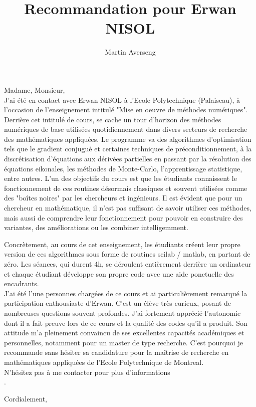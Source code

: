 \documentclass{letter}
\title{Recommandation pour Erwan NISOL}
\author{Martin Averseng}
\begin{document}
Madame, Monsieur, \\


J'ai été en contact avec Erwan NISOL à l'Ecole Polytechnique (Palaiseau), à l'occasion de l'enseignement intitulé "Mise en oeuvre de méthodes numériques". Derrière cet intitulé de cours, se cache un tour d'horizon des méthodes numériques de base utilisées quotidiennement dans divers secteurs de recherche des mathé\-matiques appliquées. Le programme va des algorithmes d'optimisation tels que le gradient conjugué et certaines techniques de préconditionnement, à la discrétisation d'équations aux dérivées partielles en passant par la résolution des équations eikonales, les méthodes de Monte-Carlo, l'apprentissage statistique, entre autres. L'un des objectifs du cours est que les étudiants connaissent le fonctionnement de ces routines désormais classiques et souvent utilisées comme des "boîtes noires" par les chercheurs et ingénieurs. Il est évident que pour un chercheur en mathématique, il n'est pas suffisant de savoir utiliser ces méthodes, mais aussi de comprendre leur fonctionnement pour pouvoir en construire des variantes, des améliorations ou les combiner intelligemment. 

Concrètement, au cours de cet enseignement, les étudiants créent leur propre version de ces algorithmes sous forme de routines scilab / matlab, en partant de zéro. Les séances, qui durent 4h, se déroulent entièrement derrière un ordinateur et chaque étudiant développe son propre code avec une aide ponctuelle des encadrants. \\

J'ai été l'une personnes chargées de ce cours et ai particulièrement remarqué la participation enthousiaste d'Erwan. C'est un élève très curieux, posant de nombreuses questions souvent profondes. J'ai fortement apprécié l'autonomie dont il a fait preuve lors de ce cours et la qualité des codes qu'il a produit. Son attitude m'a pleinement convaincu de ses excellentes capacités académiques et personnelles, notamment pour un master de type recherche. C'est pourquoi je recommande sans hésiter sa candidature pour la maîtrise de recherche en mathématiques appliquées de l'Ecole Polytechnique de Montreal. \\


N'hésitez pas à me contacter pour plus d'informations\\.

Cordialement, \\ 
\end{document}
